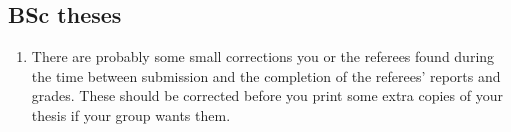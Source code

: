 \subsection{BSc theses}

\begin{enumerate}
\item There are probably some small corrections you or the referees
  found during the time between submission and the completion of the
  referees' reports and grades. These should be corrected before you
  print some extra copies of your thesis if your group wants them.
\end{enumerate}

